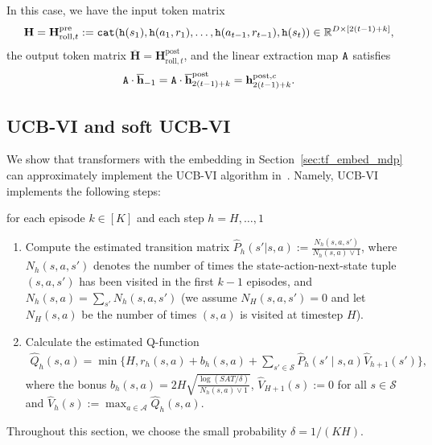 \documentclass[10pt]{article}
\renewcommand{\bar}{\overline}
\newcommand{\<}{\left\langle}
\renewcommand{\>}{\right\rangle}
\newcommand{\R}{\mathbb{R}}
\newcommand{\pre}{{\mathrm{pre}}}
\newcommand{\post}{{\mathrm{post}}}
\newcommand{\partc}{{c}}
\newcommand{\state}{{s}}
\newcommand{\action}{{a}}
\newcommand{\reward}{{r}}
\newcommand{\totlen}{{T}}
\newcommand{\cat}{{\tt cat}}
\newcommand{\extractmap}{{\tt A}}
\newcommand{\embedmap}{{\tt h}}
\newcommand{\Numepi}{{K}}
\newcommand{\horizon}{{H}}
\newcommand{\statesp}{{\mathcal{S}}}
\newcommand{\actionsp}{{\mathcal{A}}}
\renewcommand{\horizon}{{H}}
\newcommand{\bonus}{{b}}
\newcommand{\tresttransit}{\widehat{P}}
\newcommand{\valuefun}{{V}}
\newcommand{\roll}{{\mathrm{roll}}}
\newcommand{\Numst}{{S}}
\newcommand{\Numact}{{A}}
\newcommand{\Numvi}{{N}}
\newcommand{\Qfun}{{Q}}
\newcommand{\trestQfun}{{\widehat{\Qfun}}}
\newcommand{\Vfun}{{\valuefun}}
\newcommand{\trestVfun}{{\widehat{\Vfun}}}
\def\bH{{\mathbf H}}
\def\bh{{\mathbf h}}
\begin{document}
In this case, we have the input token matrix  $$\bH=\bH^\pre_{\roll,t}: = \cat(\embedmap(\state_1), \embedmap(\action_1, \reward_1), \ldots, \embedmap(\action_{t-1}, \reward_{t-1}), \embedmap(\state_t)) \in \R^{D \times [2(t-1)+k]},$$ the output token matrix $\bar{\bH}=\bH^\post_{\roll,t}$, and the linear extraction map $\extractmap$  satisfies $$\extractmap\cdot\bar{\bh}_{-1}=\extractmap\cdot\bar{\bh}^\post_{2(t-1)+k}=\bh^{\post,\partc}_{2(t-1)+k}.$$



































\subsection{UCB-VI and soft UCB-VI}\label{sec:example_ucbvi}
We show that transformers with the embedding in Section~\ref{sec:tf_embed_mdp}  can approximately implement the  UCB-VI algorithm in~\cite{azar2017minimax}. Namely, UCB-VI implements the following steps:

for each episode $k\in[\Numepi]$ and each step $h=\horizon,\ldots,1$
\begin{enumerate}
    \item Compute the estimated transition matrix $\tresttransit_h(\state'|\state,\action):=   \frac{\Numvi_h(\state,\action,\state')}{\Numvi_h(\state,\action)\vee 1}$,  where $\Numvi_h(\state,\action,\state')$ denotes the number of times the state-action-next-state tuple $(\state,\action,\state')$ has been visited in the first $k-1$ episodes, and $\Numvi_h(\state,\action)=\sum_{\state'}\Numvi_h(\state,\action,\state')$ (we assume $\Numvi_\horizon(\state,\action,\state')=0$ and let $\Numvi_\horizon(\state,\action)$  be the number of times $(\state,\action)$ is visited at timestep $\horizon$).
    \item Calculate the estimated Q-function \begin{align*}
\trestQfun_h(\state,\action)=\min\{\horizon,\reward_h(\state,\action)+\bonus_h(\state,\action)+\sum_{\state'\in\statesp}\tresttransit_h(\state'\mid\state,\action)\trestVfun_{h+1}(\state')\},\end{align*}
where the bonus $\bonus_h(\state,\action)=2\horizon\sqrt{\frac{\log(\Numst\Numact\totlen/\delta)}{\Numvi_h(\state,\action)\vee1}}$,  $\trestVfun_{\horizon+1}(\state):=0$ for all $\state\in\statesp$ and $\trestVfun_h(\state):=\max_{\action\in\actionsp}\trestQfun_h(\state,\action)$.
\end{enumerate} Throughout this section, we choose the small probability $\delta=1/(\Numepi\horizon)$.
\end{document}
